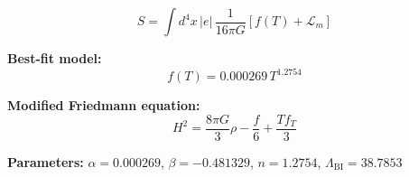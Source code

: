 
\begin{equation}
  S = \int d^4x \, |e| \, \frac{1}{16\pi G} \left[ f(T) + \mathcal{L}_m \right]
\end{equation}

\textbf{Best-fit model:}
\begin{equation}
  f(T) = 0.000269 \, T^{1.2754}
\end{equation}

\textbf{Modified Friedmann equation:}
\begin{equation}
  H^2 = \frac{8\pi G}{3} \rho - \frac{f}{6} + \frac{T f_T}{3}
\end{equation}

\textbf{Parameters:}
$\alpha = 0.000269$, \quad
$\beta = -0.481329$, \quad
$n = 1.2754$, \quad
$\Lambda_{\text{BI}} = 38.7853$